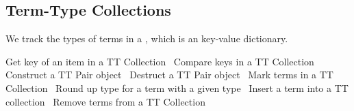 \subsection{Term-Type Collections}

We track the types of terms in a {\Tt{}\nwendquote}, which is an key-value
dictionary.

\nwenddocs{}\endmoddef\nwstartdeflinemarkup{}\nwenddeflinemarkup
\LA{}Get key of an item in a TT Collection~{\nwtagstyle{}}\RA{}
\LA{}Compare keys in a TT Collection~{\nwtagstyle{}}\RA{}
\LA{}Construct a TT Pair object~{\nwtagstyle{}}\RA{}
\LA{}Destruct a TT Pair object~{\nwtagstyle{}}\RA{}
\LA{}Mark terms in a TT Collection~{\nwtagstyle{}}\RA{}
\LA{}Round up type for a term with a given type~{\nwtagstyle{}}\RA{}
\LA{}Insert a term into a TT collection~{\nwtagstyle{}}\RA{}
\LA{}Remove terms from a TT Collection~{\nwtagstyle{}}\RA{}

\nwendcode{}\nwdocspar

